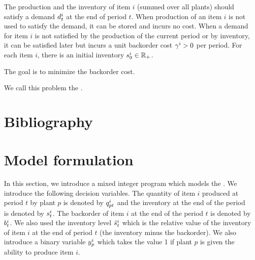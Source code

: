 The production and the inventory of item $i$ (summed over all plants) should satisfy a demand $d_t^i$ at the end of period $t$.
When production of an item $i$ is not used to satisfy the demand, it can be stored and incurs no cost.
When a demand for item $i$ is not satisfied by the production of the current period or by inventory, it can be satisfied later but incurs a unit backorder cost $\gamma^i>0$ per period.
For each item $i$, there is an initial inventory $s_0^i\in\mathbb{R}_+$.


The goal is to minimize the backorder cost.


We call this problem the \emph{\tbc}.


\section{Bibliography}




\section{Model formulation}


In this section, we introduce a mixed integer program which models the \tbc.
We introduce the following decision variables.
The quantity of item $i$ produced at period $t$ by plant $p$ is denoted by $q_{pt}^i$ and the inventory at the end of the period is denoted by $s_t^i$.
The backorder of item $i$ at the end of the period $t$ is denoted by $b_t^i$.
We also used the inventory level $\tilde{s}_t^i$ which is the relative value of the inventory of item $i$ at the end of period $t$ (\ie the inventory minus the backorder).
We also introduce a binary variable $y_p^i$ which takes the value 1 if plant $p$ is given the ability to produce item $i$.


